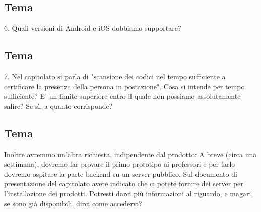 \subsection*{Tema}
6. Quali versioni di Android e iOS dobbiamo supportare?

\subsection*{Tema}
7. Nel capitolato si parla di "scansione dei codici nel tempo sufficiente a certificare la presenza della persona in postazione". Cosa si intende per tempo sufficiente? E' un limite superiore entro il quale non possiamo assolutamente salire? Se sì, a quanto corrisponde?

\subsection*{Tema}
Inoltre avremmo un'altra richiesta, indipendente dal prodotto:
A breve (circa una settimana), dovremo far provare il primo prototipo ai professori e per farlo dovremo ospitare la parte backend su un server pubblico. Sul documento di presentazione del capitolato avete indicato che ci potete fornire dei server per l'installazione dei prodotti. Potresti darci più informazioni al riguardo, e magari, se sono già disponibili, dirci come accedervi?
